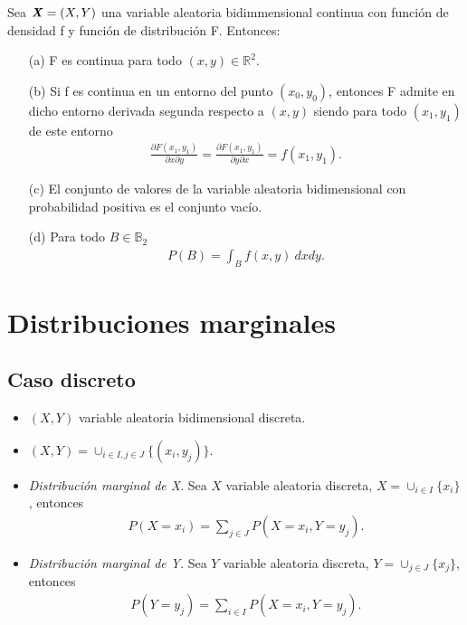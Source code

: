 \begin{teo}
Sea $\textbf{\textit{X}} = (X,Y)$ una variable aleatoria bidimmensional continua con función de densidad f y función de distribución F. Entonces:
\begin{enumerate}
    \item[(a)] F es continua para todo $(x,y) \in \mathbb{R}^2$.
    \item[(b)] Si f es continua en un entorno del punto $(x_0,y_0)$, entonces F admite en dicho entorno derivada segunda respecto a $(x,y)$ siendo para todo $(x_1,y_1)$ de este entorno
    \begin{align*}
        \frac{\partial F(x_1,y_1)}{\partial x \partial y} = \frac{\partial F(x_1, y_1)}{\partial y \partial x} = f(x_1,y_1).
    \end{align*}
    \item[(c)] El conjunto de valores de la variable aleatoria bidimensional con probabilidad positiva es el conjunto vacío.
    \item[(d)] Para todo $B \in \mathbb{B}_2$
    \begin{align*}
        P(B) = \int_{B}{f(x,y) \ dxdy}.
    \end{align*}
\end{enumerate}
\end{teo}

\section{Distribuciones marginales}

\subsection{Caso discreto}
\begin{itemize}
    \item $(X,Y)$ variable aleatoria bidimensional discreta.
    \item $(X,Y) = \cup_{i \in I, j \in J}{\{(x_i,y_j)\}}$.
    \item \textit{Distribución marginal de X}. Sea $X$ variable aleatoria discreta, $X = \cup_{i \in I}{\{x_i\}}$, entonces
    \begin{align*}
        P(X = x_i) = \sum_{j \in J}{P(X = x_i, Y = y_j)}.
    \end{align*}
    \item \textit{Distribución marginal de Y}. Sea $Y$ variable aleatoria discreta, $Y = \cup_{j \in J}{\{x_j\}}$, entonces
    \begin{align*}
        P(Y = y_j) = \sum_{i \in I}{P(X = x_i, Y = y_j)}.
    \end{align*}
\end{itemize}

